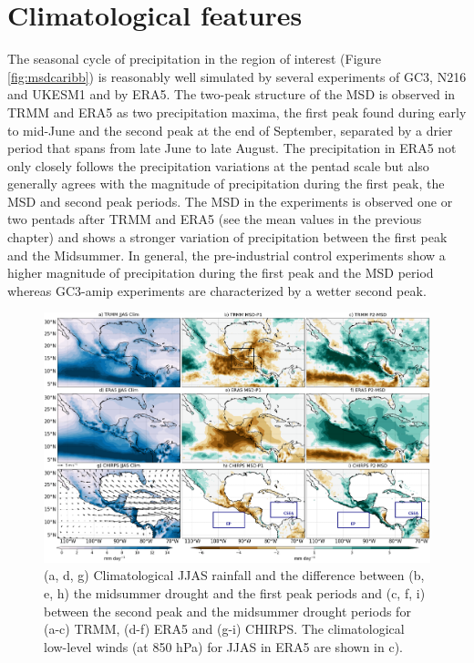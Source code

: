 \section{Climatological features}

\label{sq:msdclim}



The seasonal cycle of precipitation in the region of interest (Figure \ref{fig:msdcaribb}) is reasonably well simulated by several experiments of GC3, N216 and UKESM1 and by ERA5.
The two-peak structure of the MSD is observed in TRMM and ERA5 as two precipitation maxima, the first peak found during early to mid-June and the second peak at the end of September, separated by a drier period that spans from late June to late August. The precipitation in ERA5 not only closely follows the precipitation variations at the pentad scale but also generally agrees with the magnitude of precipitation during the first peak, the MSD and second peak periods.
The MSD in the experiments is observed one or two pentads after TRMM and ERA5 (see the mean values in the previous chapter) and shows a stronger variation of precipitation between the first peak and the Midsummer. 
In general, the pre-industrial control experiments show a higher magnitude of precipitation during the first peak and the MSD period whereas GC3-amip experiments are characterized by a wetter second peak. 

  \begin{figure}[t!]
\includegraphics[width=\linewidth]{figures/fig2obs_prdiff_2.png}
\caption[Observed composites of climatological and seasonal variations of precipitation.]{ (a, d, g) Climatological JJAS rainfall and the difference between  (b, e, h)  the midsummer drought and the first peak periods and (c, f, i)  between the second peak and the midsummer drought periods for (a-c) TRMM, (d-f) ERA5 and (g-i) CHIRPS. The climatological low-level winds (at 850 hPa) for JJAS in ERA5 are shown in c). }
\label{fig:eof2}
\end{figure} 
 



